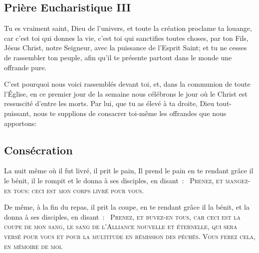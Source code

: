 \subsection*{Prière Eucharistique III}\label{pe3}

Tu es vraiment saint, Dieu de l'univers,
et toute la création proclame ta louange,
car c'est toi qui donnes la vie,
c'est toi qui sanctifies toutes choses,
par ton Fils, Jésus Christ, notre Seigneur,
avec la puissance de l'Esprit Saint;
et tu ne cesses de rassembler ton peuple,
afin qu'il te présente
partout dans le monde
une offrande pure.


C'est pourquoi nous voici rassemblés devant toi,
et, dans la communion de toute l'Église,
en ce premier jour de la semaine
nous célébrons le jour
où le Christ est ressuscité d'entre les morts.
Par lui, que tu as élevé à ta droite,
Dieu tout-puissant, nous te supplions
de consacrer toi-même
les offrandes que nous apportons:

\subsection*{Consécration}

La nuit même où il fut livré, il prit le pain, Il prend le pain
en te rendant grâce il le bénit, il le rompit
et le donna à ses disciples, en disant~: 
\textsc{\og~Prenez, et mangez-en tous:} 
\textsc{ceci est mon corps livré pour vous.~\fg}



De même, à la fin du repas,
il prit la coupe, 
en te rendant grâce il la bénit,
et la donna à ses disciples, en disant~:
\textsc{\og~Prenez, et buvez-en tous,} 
\textsc{car ceci est la coupe de mon sang,
le sang de l'Alliance nouvelle et éternelle,
qui sera versé
pour vous et pour la multitude
en rémission des péchés.
Vous ferez cela, en mémoire de moi.~\fg}


